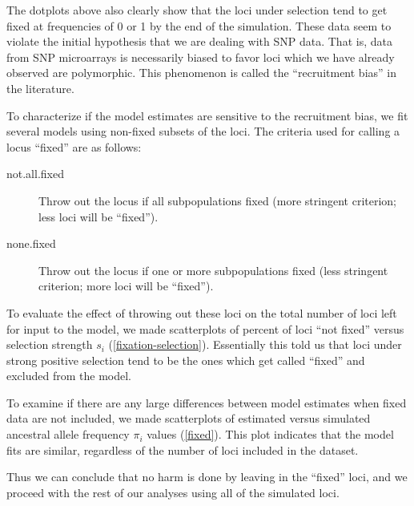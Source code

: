 \documentclass[a4paper,12pt]{article}
\begin{document}
The dotplots above also clearly show that the loci under selection
tend to get fixed at frequencies of 0 or 1 by the end of the
simulation. These data seem to violate the initial hypothesis that we
are dealing with SNP data. That is, data from SNP microarrays is
necessarily biased to favor loci which we have already observed are
polymorphic. This phenomenon is called the ``recruitment bias'' in the
literature.

To characterize if the model estimates are sensitive to the
recruitment bias, we fit several models using non-fixed subsets of the
loci. The criteria used for calling a locus ``fixed'' are as follows:
\begin{description}
\item[not.all.fixed] Throw out the locus if all subpopulations fixed
  (more stringent criterion; less loci will be ``fixed'').
\item[none.fixed] Throw out the locus if one or more subpopulations
  fixed (less stringent criterion; more loci will be ``fixed'').
\end{description}


To evaluate the effect of throwing out these loci on the total number
of loci left for input to the model, we made scatterplots of percent
of loci ``not fixed'' versus selection strength $s_i$
(\autoref{fixation-selection}). Essentially this told us that loci
under strong positive selection tend to be the ones which get called
``fixed'' and excluded from the model.


To examine if there are any large differences between model estimates
when fixed data are not included, we made scatterplots of estimated
versus simulated ancestral allele frequency $\pi_i$ values
(\autoref{fixed}). This plot indicates that the model fits are
similar, regardless of the number of loci included in the dataset.

Thus we can conclude that no harm is done by leaving in the ``fixed''
loci, and we proceed with the rest of our analyses using all of the
simulated loci.
\end{document}

